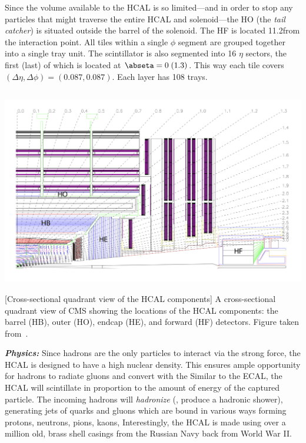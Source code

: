 Since the volume available to the HCAL is so limited---and in order to stop any particles that might traverse the entire HCAL and solenoid---the HO (the \emph{tail catcher}) is situated outside the barrel of the solenoid.
The HF is located 11.2\meter from the interaction point.
All tiles within a single $\phi$ segment are grouped together into a single tray unit.
The scintillator is also segmented into 16 $\eta$ sectors, the first (last) of which is located at $\abseta = 0\;(1.3)$.
This way each tile covers $(\Delta \eta, \Delta \phi) = (0.087, 0.087)$.
Each layer has 108 trays.
\begin{multiFigure}
    \centering
    \includegraphics[height=9cm]{figures/cms/hcal/hcal_quadrants_longitudinalview.jpg}
        [Cross-sectional quadrant view of the HCAL components]
        {A cross-sectional quadrant view of CMS showing the locations of the HCAL components:
        the barrel (HB), outer (HO), endcap (HE), and forward (HF) detectors.
        Figure taken from~\cite{collaboration_cms_2008}.
        }
    \label{fig:hcal_quadrant}
\end{multiFigure}

\textit{\textbf{Physics:}}
Since hadrons are the only particles to interact via the strong force, the HCAL is designed to have a high nuclear density.
This ensures ample opportunity for hadrons to radiate gluons and convert  with the Similar to the ECAL, the HCAL will scintillate in proportion to the amount of energy of the captured particle. 
The incoming hadrons will \emph{hadronize} (\ie, produce a hadronic shower), generating jets of quarks and gluons which are bound in various ways forming protons, neutrons, pions, kaons, \etc
Interestingly, the HCAL is made using over a million old, brass shell casings from the Russian Navy back from World War II.

